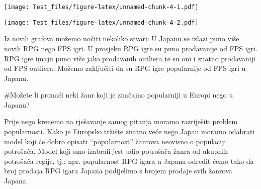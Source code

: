 \documentclass[
]{article}
\newenvironment{Shaded}{\begin{snugshade}}{\end{snugshade}}
\newcommand{\AttributeTok}[1]{\textcolor[rgb]{0.77,0.63,0.00}{#1}}
\newcommand{\ConstantTok}[1]{\textcolor[rgb]{0.00,0.00,0.00}{#1}}
\newcommand{\FunctionTok}[1]{\textcolor[rgb]{0.00,0.00,0.00}{#1}}
\newcommand{\NormalTok}[1]{#1}
\newcommand{\OtherTok}[1]{\textcolor[rgb]{0.56,0.35,0.01}{#1}}
\newcommand{\SpecialCharTok}[1]{\textcolor[rgb]{0.00,0.00,0.00}{#1}}
\newcommand{\StringTok}[1]{\textcolor[rgb]{0.31,0.60,0.02}{#1}}
\begin{document}
\texttt{[image: Test\_files/figure-latex/unnamed-chunk-4-1.pdf]}

\begin{Shaded}
\end{Shaded}

\texttt{[image: Test\_files/figure-latex/unnamed-chunk-4-2.pdf]}

Iz novih grafova možemo uočiti nekoliko stvari: U Japanu se izlazi puno
više novih RPG nego FPS igri. U prosjeku RPG igre su puno prodavanije od
FPS igri. RPG igre imaju puno više jako prodavanih outliera te su oni i
znatno prodavaniji od FPS outliera. Možemo zaključiti da su RPG igre
popularnije od FPS igri u Japanu.

\#Možete li pronaći neki žanr koji je značajno popularniji u Europi nego
u Japanu?

Prije nego krenemo na rješavanje samog pitanja moramo razriješiti
problem popularnosti. Kako je Europsko tržište znatno veće nego Japan
moramo odabrati model koji će dobro opisati ``popularnost'' žanrova
neovisno o populaciji potrošača. Model koji smo izabrali jest udio
potrošača žanra od ukupnih potrošača regije, tj.: npr. popularnost RPG
igara u Japanu odredit ćemo tako da broj prodaja RPG igara Japana
podijelimo s brojem prodaje svih žanrova Japana.
\end{document}
